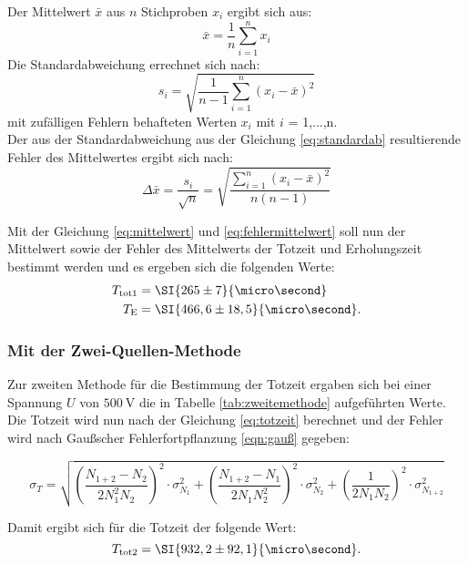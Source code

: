 Der Mittelwert $\bar{x}$ aus $n$ Stichproben $x_{i}$ ergibt sich aus:
\begin{equation}
\bar{x}=\frac{1}{n}\sum \limits_{i=1}^n x_{i}
\label{eq:mittelwert}
\end{equation}
Die Standardabweichung errechnet sich nach:
\begin{equation}
\label{eq:standardab}
s_{i}= \sqrt{\frac{1}{n-1}\sum \limits_{i=1}^n(x_{i}-\bar{x})^2}
\end{equation}
mit zufälligen Fehlern behafteten Werten $x_{i}$ mit $i$ = 1,...,n.\\
Der aus der Standardabweichung aus der Gleichung \ref{eq:standardab} resultierende Fehler des Mittelwertes ergibt sich nach:
\begin{equation}
\Delta\bar{x}=\frac{s_{i}}{\sqrt{n}} = \sqrt{\frac{\sum\limits_{i=1}^n(x_{i}-\bar{x})^2}{n(n-1)}}
\label{eq:fehlermittelwert}
\end{equation}

Mit der Gleichung \ref{eq:mittelwert} und \ref{eq:fehlermittelwert} soll nun der Mittelwert sowie der Fehler des Mittelwerts der Totzeit und Erholungszeit bestimmt werden und es ergeben sich die folgenden Werte:
\begin{align*}
T_\text{tot1} &= \SI{265 \pm 7}{\micro\second} \\
T_\text{E} &= \SI{466,6 \pm 18,5}{\micro\second}.
\end{align*}

\subsubsection{Mit der Zwei-Quellen-Methode}
Zur zweiten Methode für die Bestimmung der Totzeit ergaben sich bei einer Spannung $U$ von $\SI{500}{\volt}$ die in Tabelle \ref{tab:zweitemethode} aufgeführten Werte. Die Totzeit wird nun nach der Gleichung \ref{eq:totzeit} berechnet und der Fehler wird nach Gaußscher Fehlerfortpflanzung \ref{eqn:gauß} gegeben:

\begin{equation}
\label{eqn:gauß}
\sigma_T = \sqrt{ \left(\frac{N_{1+2}-N_{2}}{2N_{1}^{2}N_{2}}\right)^2 \cdot \sigma_{N_{1}}^2+ \left(\frac{N_{1+2}-N_{1}}{2N_{1}N_{2}^{2}}\right)^2 \cdot \sigma_{N_{2}}^2+\left(\frac{1}{2N_1N_2}\right)^2 \cdot \sigma_{N_{1+2}}^2} 
\end{equation}

Damit ergibt sich für die Totzeit der folgende Wert:
\begin{equation*}
T_\text{tot2} = \SI{932,2 \pm 92,1}{\micro\second}.
\end{equation*}

